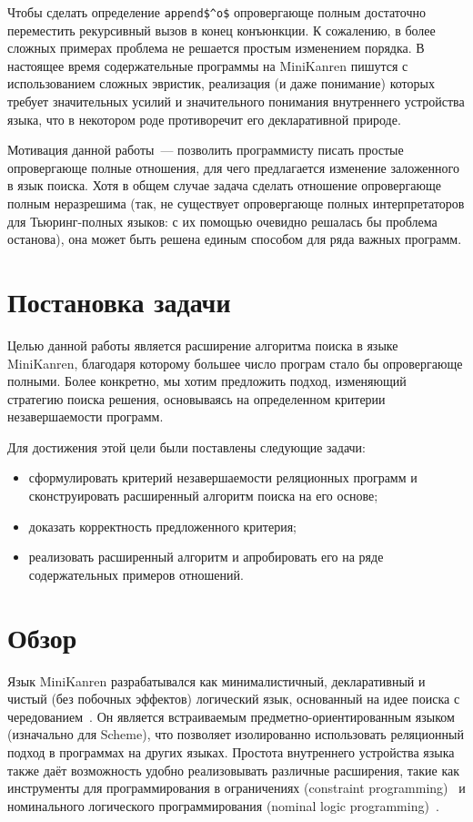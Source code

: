     Чтобы сделать определение \lstinline|append$^o$| опровергающе полным достаточно переместить рекурсивный вызов в конец конъюнкции. К сожалению, в более сложных примерах проблема не решается простым изменением порядка. В настоящее время содержательные программы на MiniKanren пишутся с использованием сложных эвристик, реализация (и даже понимание) которых требует значительных усилий и значительного понимания внутреннего устройства языка, что в некотором роде противоречит его декларативной природе.

    Мотивация данной работы~--- позволить программисту писать простые опровергающе полные отношения, для чего предлагается изменение заложенного в язык поиска. Хотя в общем случае задача сделать отношение опровергающе полным неразрешима (так, не существует опровергающе полных интерпретаторов для Тьюринг-полных языков: с их помощью очевидно решалась бы проблема останова), она может быть решена единым способом для ряда важных программ.

  \section{Постановка задачи}
  
    Целью данной работы является расширение алгоритма поиска в языке MiniKanren, благодаря которому большее число програм стало бы опровергающе полными. Более конкретно, мы хотим предложить подход, изменяющий стратегию поиска решения, основываясь на определенном критерии незавершаемости программ.

    Для достижения этой цели были поставлены следующие задачи:
  
    \begin{itemize}
      \item сформулировать критерий незавершаемости реляционных программ и сконструировать расширенный алгоритм поиска на его основе;
      \item доказать корректность предложенного критерия;
      \item реализовать расширенный алгоритм и апробировать его на ряде содержательных примеров отношений.
    \end{itemize}
  
  \section{Обзор}
  
    Язык MiniKanren разрабатывался как минималистичный, декларативный и чистый (без побочных эффектов) логический язык, основанный на идее поиска с чередованием~\cite{Interleaving}. Он является встраиваемым предметно-ориентированным языком (изначально для Scheme), что позволяет изолированно использовать реляционный подход в программах на других языках. Простота внутреннего устройства языка также даёт возможность удобно реализовывать различные расширения, такие как инструменты для программирования в ограничениях (constraint programming)~\cite{CKanren} и номинального логического программирования (nominal logic programming)~\cite{alphaKanren}.

